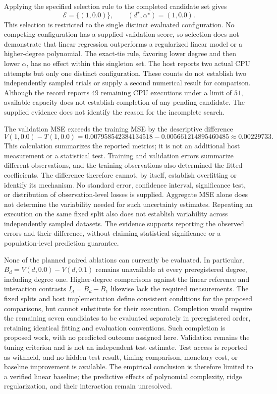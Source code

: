 \documentclass[11pt]{article}
\begin{document}
Applying the specified selection rule to the completed candidate set gives
\[
\mathcal{E}=\{(1,0.0)\},
\qquad
(d^\star,\alpha^\star)=(1,0.0).
\]
This selection is restricted to the single distinct evaluated configuration. No competing configuration has a supplied validation score, so selection does not demonstrate that linear regression outperforms a regularized linear model or a higher-degree polynomial. The exact-tie rule, favoring lower degree and then lower \(\alpha\), has no effect within this singleton set. The host reports two actual CPU attempts but only one distinct configuration. These counts do not establish two independently sampled trials or supply a second numerical result for comparison. Although the record reports \(49\) remaining CPU executions under a limit of \(51\), available capacity does not establish completion of any pending candidate. The supplied evidence does not identify the reason for the incomplete search.

The validation MSE exceeds the training MSE by the descriptive difference
\[
V(1,0.0)-T(1,0.0)
=
0.007958542384134518-0.005661214895460485
\approx 0.00229733.
\]
This calculation summarizes the reported metrics; it is not an additional host measurement or a statistical test. Training and validation errors summarize different observations, and the training observations also determined the fitted coefficients. The difference therefore cannot, by itself, establish overfitting or identify its mechanism. No standard error, confidence interval, significance test, or distribution of observation-level losses is supplied. Aggregate MSE alone does not determine the variability needed for such uncertainty estimates. Repeating an execution on the same fixed split also does not establish variability across independently sampled datasets. The evidence supports reporting the observed errors and their difference, without claiming statistical significance or a population-level prediction guarantee.

None of the planned paired ablations can currently be evaluated. In particular, \(B_d=V(d,0.0)-V(d,0.1)\) remains unavailable at every preregistered degree, including degree one. Higher-degree comparisons against the linear reference and interaction contrasts \(I_d=B_d-B_1\) likewise lack the required measurements. The fixed splits and host implementation define consistent conditions for the proposed comparisons, but cannot substitute for their execution. Completion would require the remaining seven candidates to be evaluated separately in preregistered order, retaining identical fitting and evaluation conventions. Such completion is proposed work, with no predicted outcome assigned here. Validation remains the tuning criterion and is not an independent test estimate. Test access is reported as withheld, and no hidden-test result, timing comparison, monetary cost, or baseline improvement is available. The empirical conclusion is therefore limited to a verified linear baseline; the predictive effects of polynomial complexity, ridge regularization, and their interaction remain unresolved.
\end{document}
